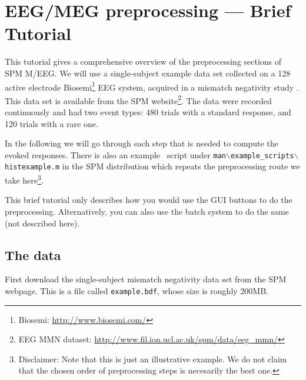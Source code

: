 \chapter{EEG/MEG preprocessing --- Brief Tutorial \label{Chap:eeg:tutorial}}

This tutorial gives a comprehensive overview of the preprocessing sections of SPM M/EEG. We will use a single-subject example data set collected on a 128 active electrode Biosemi\footnote{Biosemi: \url{http://www.biosemi.com/}} EEG system, acquired in a mismatch negativity study \cite{mg_dcm_repro}. This data set is available from the SPM website\footnote{EEG MMN dataset: \url{http://www.fil.ion.ucl.ac.uk/spm/data/eeg\_mmn/}}. The data were recorded continuously and had two event types: 480 trials with a standard response, and 120 trials with a rare one.

In the following we will go through each step that is needed to compute the evoked responses. There is also an example \matlab\ script under \texttt{man$\backslash$example\_scripts$\backslash$histexample.m} in the SPM distribution which repeats the preprocessing route we take here\footnote{Disclaimer: Note that this is just an illustrative example. We do not claim that the chosen order of preprocessing steps is necesarily the best one.}.

This brief tutorial only describes how you would use the GUI buttons to do the preprocessing. Alternatively, you can also use the batch system to do the same (not described here).

\section{The data}
First download the single-subject mismatch negativity data set from the SPM webpage\footnotemark[2]. This is a file called \texttt{example.bdf}, whose size is roughly 200MB.

